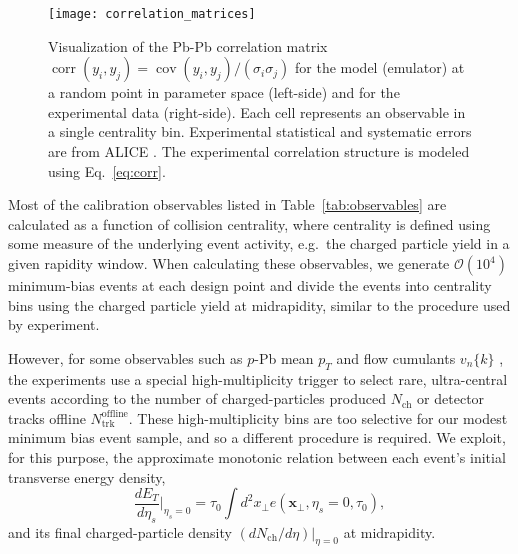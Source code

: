 \documentclass[aps,prc,reprint,amsmath,nofootinbib]{revtex4-1}
\newcommand{\nch}{N_\text{ch}}
\newcommand{\ntrk}{N_\text{trk}^\text{offline}}
\newcommand{\vnk}[2]{v_#1\{#2\}}
\newcommand{\xv}{\mathbf x}
\newcommand{\order}[1]{$\mathcal O(10^{#1})$}
\DeclareMathOperator{\cov}{cov}
\DeclareMathOperator{\corr}{corr}
\begin{document}
\begin{figure}[t]
  \texttt{[image: correlation\_matrices]}
  \caption{
    \label{fig:correlation}
    Visualization of the Pb-Pb correlation matrix $\corr(y_i, y_j) = \cov(y_i,y_j)/(\sigma_i \sigma_j)$ for the model (emulator) at a random point in parameter space (left-side) and for the experimental data (right-side).
    Each cell represents an observable in a single centrality bin. Experimental statistical and systematic errors are from ALICE \cite{Adam:2015ptt, Adam:2016izf}.
    The experimental correlation structure is modeled using Eq.~\eqref{eq:corr}.
  }
\end{figure}

Most of the calibration observables listed in Table~\ref{tab:observables} are calculated as a function of collision centrality, where centrality is defined using some measure of the underlying event activity, e.g.\ the charged particle yield in a given rapidity window.
When calculating these observables, we generate \order{4} minimum-bias events at each design point and divide the events into centrality bins using the charged particle yield at midrapidity, similar to the procedure used by experiment.

However, for some observables such as $p$-Pb mean $p_T$ \cite{Abelev:2013bla} and flow cumulants $\vnk{n}{k}$ \cite{Chatrchyan:2013nka}, the experiments use a special high-multiplicity trigger to select rare, ultra-central events according to the number of charged-particles produced $\nch$ or detector tracks offline $\ntrk$.
These high-multiplicity bins are too selective for our modest minimum bias event sample, and so a different procedure is required.
We exploit, for this purpose, the approximate monotonic relation between each event's initial transverse energy density,
\begin{equation}
  \frac{dE_T}{d\eta_s} \bigg\vert_{\eta_s=0} = \tau_0 \int d^2x_\perp e(\xv_\perp, \eta_s=0, \tau_0),
\end{equation}
and its final charged-particle density $(d\nch/d\eta) \vert_{\eta=0}$ at midrapidity.
\end{document}
